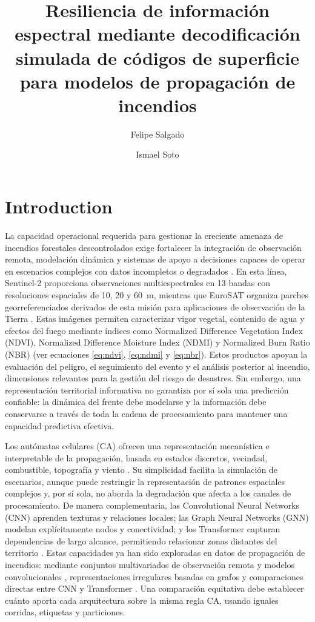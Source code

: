 \documentclass[fleqn,10pt]{wlscirep}
\title{Resiliencia de información espectral mediante decodificación simulada de códigos de superficie para modelos de propagación de incendios}
\author[1,*]{Felipe Salgado}
\author[1]{Ismael Soto}
\affil[1]{Departamento de Ingeniería Eléctrica, Universidad de Santiago de Chile (USACH), Santiago, Chile}
\affil[*]{felipe.salgado@usach.cl}
\begin{document}
\raggedbottom
\maketitle
\thispagestyle{empty}

\section*{Introduction}

La capacidad operacional requerida para gestionar la creciente amenaza de incendios forestales descontrolados exige fortalecer la integración de observación remota, modelación dinámica y sistemas de apoyo a decisiones capaces de operar en escenarios complejos con datos incompletos o degradados \cite{godfree2021,sanmiguelayanz2023,ghali2023}. En esta línea, Sentinel-2 proporciona observaciones multiespectrales en 13 bandas con resoluciones espaciales de 10, 20 y 60~m, mientras que EuroSAT organiza parches georreferenciados derivados de esta misión para aplicaciones de observación de la Tierra \cite{drusch2012,helber2019}. Estas imágenes permiten caracterizar vigor vegetal, contenido de agua y efectos del fuego mediante índices como Normalized Difference Vegetation Index (NDVI), Normalized Difference Moisture Index (NDMI) y Normalized Burn Ratio (NBR) \cite{tucker1979,gao1996,miller2007} (ver ecuaciones \ref{eq:ndvi}, \ref{eq:ndmi} y \ref{eq:nbr}). Estos productos apoyan la evaluación del peligro, el seguimiento del evento y el análisis posterior al incendio, dimensiones relevantes para la gestión del riesgo de desastres. Sin embargo, una representación territorial informativa no garantiza por sí sola una predicción confiable: la dinámica del frente debe modelarse y la información debe conservarse a través de toda la cadena de procesamiento para mantener una capacidad predictiva efectiva.

Los autómatas celulares (CA) ofrecen una representación mecanística e interpretable de la propagación, basada en estados discretos, vecindad, combustible, topografía y viento \cite{alexandridis2008,hernandez2007}. Su simplicidad facilita la simulación de escenarios, aunque puede restringir la representación de patrones espaciales complejos y, por sí sola, no aborda la degradación que afecta a los canales de procesamiento. De manera complementaria, las Convolutional Neural Networks (CNN) aprenden texturas y relaciones locales; las Graph Neural Networks (GNN) modelan explícitamente nodos y conectividad; y los Transformer capturan dependencias de largo alcance, permitiendo relacionar zonas distantes del territorio \cite{lecun2015,kipf2017,vaswani2017}. Estas capacidades ya han sido exploradas en datos de propagación de incendios: mediante conjuntos multivariados de observación remota y modelos convolucionales \cite{huot2022,zhang2023}, representaciones irregulares basadas en grafos \cite{jiang2022} y comparaciones directas entre CNN y Transformer \cite{zhou2025}. Una comparación equitativa debe establecer cuánto aporta cada arquitectura sobre la misma regla CA, usando iguales corridas, etiquetas y particiones.
\end{document}
